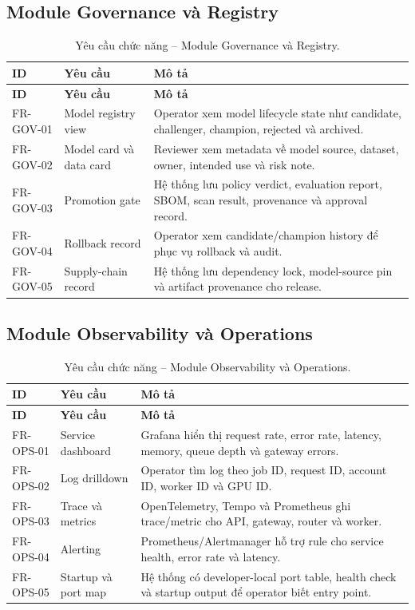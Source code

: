 \documentclass[12pt,a4paper,oneside]{report}
\begin{document}
\subsection{Module Governance và Registry}

\begingroup
\small
\begin{longtable}{p{2.05cm}p{4.05cm}p{8.05cm}}
\caption{Yêu cầu chức năng -- Module Governance và Registry.}\\
\toprule
\textbf{ID} & \textbf{Yêu cầu} & \textbf{Mô tả} \\
\midrule
\endfirsthead
\toprule
\textbf{ID} & \textbf{Yêu cầu} & \textbf{Mô tả} \\
\midrule
\endhead
FR-GOV-01 & Model registry view & Operator xem model lifecycle state như candidate, challenger, champion, rejected và archived. \\
FR-GOV-02 & Model card và data card & Reviewer xem metadata về model source, dataset, owner, intended use và risk note. \\
FR-GOV-03 & Promotion gate & Hệ thống lưu policy verdict, evaluation report, SBOM, scan result, provenance và approval record. \\
FR-GOV-04 & Rollback record & Operator xem candidate/champion history để phục vụ rollback và audit. \\
FR-GOV-05 & Supply-chain record & Hệ thống lưu dependency lock, model-source pin và artifact provenance cho release. \\
\bottomrule
\end{longtable}
\endgroup

\subsection{Module Observability và Operations}

\begingroup
\small
\begin{longtable}{p{2.05cm}p{4.05cm}p{8.05cm}}
\caption{Yêu cầu chức năng -- Module Observability và Operations.}\\
\toprule
\textbf{ID} & \textbf{Yêu cầu} & \textbf{Mô tả} \\
\midrule
\endfirsthead
\toprule
\textbf{ID} & \textbf{Yêu cầu} & \textbf{Mô tả} \\
\midrule
\endhead
FR-OPS-01 & Service dashboard & Grafana hiển thị request rate, error rate, latency, memory, queue depth và gateway errors. \\
FR-OPS-02 & Log drilldown & Operator tìm log theo job ID, request ID, account ID, worker ID và GPU ID. \\
FR-OPS-03 & Trace và metrics & OpenTelemetry, Tempo và Prometheus ghi trace/metric cho API, gateway, router và worker. \\
FR-OPS-04 & Alerting & Prometheus/Alertmanager hỗ trợ rule cho service health, error rate và latency. \\
FR-OPS-05 & Startup và port map & Hệ thống có developer-local port table, health check và startup output để operator biết entry point. \\
\bottomrule
\end{longtable}
\endgroup
\end{document}
